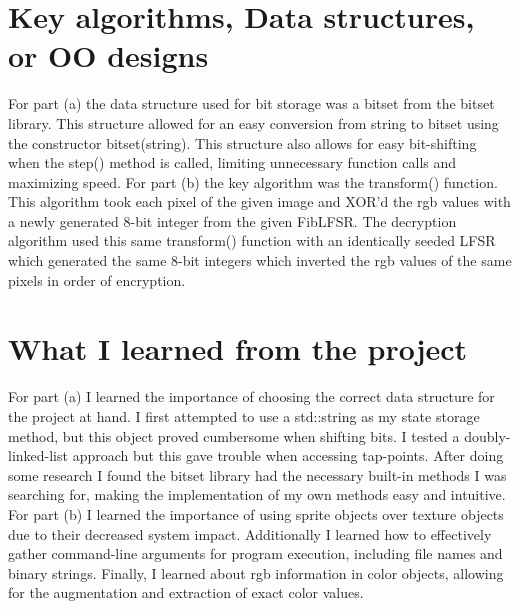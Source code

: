 \documentclass[12pt]{article}
\begin{document}
\section[2]{Key algorithms, Data structures, or OO designs}
\hfill\begin{minipage}{\dimexpr\textwidth-1cm}
For part (a) the data structure used for bit storage was a bitset from the bitset library. This structure allowed for an easy conversion from string to bitset using the constructor bitset(string). This structure also allows for easy bit-shifting when the step() method is called, limiting unnecessary function calls and maximizing speed. \newline
\newline
For part (b) the key algorithm was the transform() function. This algorithm took each pixel of the given image and XOR’d the rgb values with a newly generated 8-bit integer from the given FibLFSR. The decryption algorithm used this same transform() function with an identically seeded LFSR which generated the same 8-bit integers which inverted the rgb values of the same pixels in order of encryption.
\end{minipage}

\section[3]{What I learned from the project}
\hfill\begin{minipage}{\dimexpr\textwidth-1cm}
For part (a) I learned the importance of choosing the correct data structure for the project at hand. I first attempted to use a std::string as my state storage method, but this object proved cumbersome when shifting bits. I tested a doubly-linked-list approach but this gave trouble when accessing tap-points. After doing some research I found the bitset library had the necessary built-in methods I was searching for, making the implementation of my own methods easy and intuitive. \newline
\newline
For part (b) I learned the importance of using sprite objects over texture objects due to their decreased system impact. Additionally I learned how to effectively gather command-line arguments for program execution, including file names and binary strings. Finally, I learned about rgb information in color objects, allowing for the augmentation and extraction of exact color values.
\end{minipage}
\end{document}
